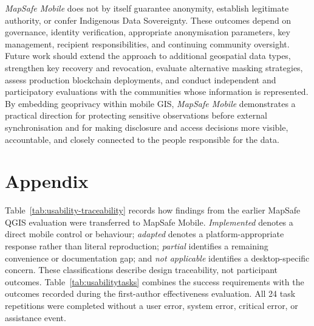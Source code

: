 \documentclass[]{interact}
\begin{document}
\textit{MapSafe Mobile} does not by itself guarantee anonymity, establish legitimate authority, or confer Indigenous Data Sovereignty. These outcomes depend on governance, identity verification, appropriate anonymisation parameters, key management, recipient responsibilities, and continuing community oversight. Future work should extend the approach to additional geospatial data types, strengthen key recovery and revocation, evaluate alternative masking strategies, assess production blockchain deployments, and conduct independent and participatory evaluations with the communities whose information is represented. By embedding geoprivacy within mobile GIS, \textit{MapSafe Mobile} demonstrates a practical direction for protecting sensitive observations before external synchronisation and for making disclosure and access decisions more visible, accountable, and closely connected to the people responsible for the data.

\section*{Appendix}

\noindent Table~\ref{tab:usability-traceability} records how findings from the earlier MapSafe QGIS evaluation were transferred to MapSafe Mobile. \emph{Implemented} denotes a direct mobile control or behaviour; \emph{adapted} denotes a platform-appropriate response rather than literal reproduction; \emph{partial} identifies a remaining convenience or documentation gap; and \emph{not applicable} identifies a desktop-specific concern. These classifications describe design traceability, not participant outcomes. Table~\ref{tab:usabilitytasks} combines the success requirements with the outcomes recorded during the first-author effectiveness evaluation. All 24 task repetitions were completed without a user error, system error, critical error, or assistance event.
\end{document}
